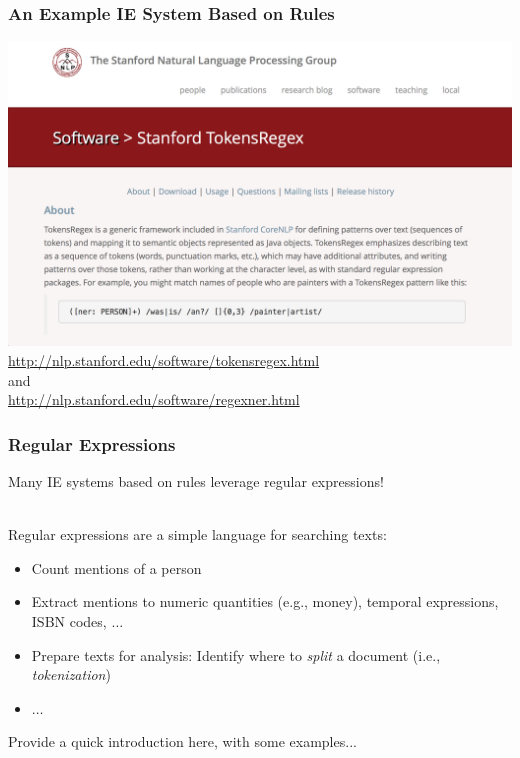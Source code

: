 \documentclass{beamer}
\begin{document}
\begin{frame}
  \frametitle{An Example IE System Based on Rules}
  \centering
  \includegraphics[width=\linewidth]{tokensregex}\\
  \footnotesize\url{http://nlp.stanford.edu/software/tokensregex.html} \\and\\ \url{http://nlp.stanford.edu/software/regexner.html}
\end{frame}

\begin{frame}
\frametitle{Regular Expressions}
Many IE systems based on rules leverage regular expressions!


~\\

Regular expressions are a simple language for searching texts:  
\begin{itemize}
\item Count mentions of a person
\item Extract mentions to numeric quantities (e.g., money), temporal expressions, ISBN codes, $\ldots$ 
\item Prepare texts for analysis: Identify where to {\it split} a document (i.e., \emph{tokenization})
\item $\ldots$
\end{itemize}
Provide a quick introduction here, with some examples...
\end{frame}
\end{document}
